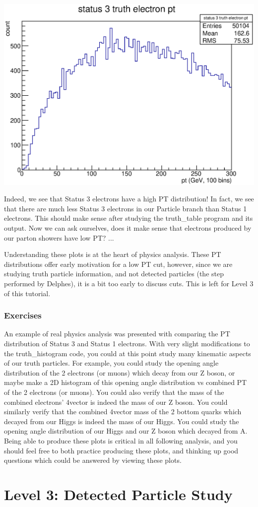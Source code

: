 \documentclass{article}
\begin{document}
\bigskip

\includegraphics[width = \linewidth]{truth_electron_3_pt.eps}

\bigskip

Indeed, we see that Status 3 electrons have a high PT distribution! In fact, we see that there are much less Status 3 electrons in our Particle branch than Status 1 electrons. This should make sense after studying the truth\_table program and its output. Now we can ask ourselves, does it make sense that electrons produced by our parton showers have low PT? ...

\bigskip

Understanding these plots is at the heart of physics analysis. These PT distributions offer early motivation for a low PT cut, however, since we are studying truth particle information, and not detected particles (the step performed by Delphes), it is a bit too early to discuss cuts. This is left for Level 3 of this tutorial.

\subsubsection*{Exercises}

An example of real physics analysis was presented with comparing the PT distribution of Status 3 and Status 1 electrons. With very slight modifications to the truth\_histogram code, you could at this point study many kinematic aspects of our truth particles. For example, you could study the opening angle distribution of the 2 electrons (or muons) which decay from our Z boson, or maybe make a 2D histogram of this opening angle distribution vs combined PT of the 2 electrons (or muons). You could also verify that the mass of the combined electrons' 4vector is indeed the mass of our Z boson. You could similarly verify that the combined 4vector mass of the 2 bottom quarks which decayed from our Higgs is indeed the mass of our Higgs. You could study the opening angle distribution of our Higgs and our Z boson which decayed from A. Being able to produce these plots is critical in all following analysis, and you should feel free to both practice producing these plots, and thinking up good questions which could be answered by viewing these plots.

\section{Level 3: Detected Particle Study}
\end{document}
